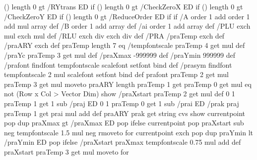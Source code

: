 {{       (\psk@RYtrans) length 0 gt { {\psk@RYtrans\space} /RYtrans ED } if
       (\psk@CheckZeroX) length 0 gt { {\psk@CheckZeroX\space} /CheckZeroX ED } if
       (\psk@CheckZeroY) length 0 gt { {\psk@CheckZeroY\space} /CheckZeroY ED } if
       (\psk@ReduceOrder) length 0 gt { {\psk@ReduceOrder\space} /ReduceOrder ED } if } if %
  /A order 1 add order 1 add mul array def
  /B order 1 add array def
  /ai order 1 add array def
  /PLU {exch \pst@number\psxunit\space mul exch \pst@number\psyunit\space mul } def
  /RLU {exch \pst@number\psxunit\space div exch \pst@number\psyunit\space div } def
  /PRA { %
         /praTemp exch def /praARY exch def
         praTemp length 7 eq {%
         /tempfontscale \psk@fontscale praTemp 4 get mul def
         /praYc praTemp 3 get \pst@number\psyunit\space mul def
         /praXmax -999999 def
         /praYmin 999999 def
         /prafont {\psk@PSfont\space findfont tempfontscale scalefont setfont} bind def
         /prasym { \psk@symbolFont\space findfont tempfontscale 2 mul scalefont setfont} bind def
         prafont
         praTemp 2 get \pst@number\psxunit\space mul praTemp 3 get \pst@number\psyunit\space mul moveto
         praARY length praTemp 1 get praTemp 0 get mul eq not { (Row x Col > Vector Dim) show }{%
         /praXstart praTemp 2 get \pst@number\psxunit\space mul def
         0 1 praTemp 1 get 1 sub {/praj ED
         0 1 praTemp 0 get 1 sub {/prai ED /prak praj praTemp 1 get prai mul add def
         praARY prak get \psk@valuewidth string cvs show
         currentpoint pop dup praXmax gt { /praXmax ED }{ pop } ifelse
         currentpoint pop praXstart sub neg tempfontscale 1.5 mul neg rmoveto
         } for
         currentpoint exch pop dup praYmin lt { /praYmin ED }{ pop } ifelse
         /praXstart praXmax tempfontscale 0.75 mul add def
         praXstart praTemp 3 get \pst@number\psyunit\space mul moveto
         } for
}}}}
